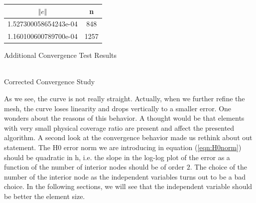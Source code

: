 \documentclass[a4paper,12pt]{article}
\makeatletter
\newenvironment{tablehere}
  {\def\@captype{table}}
  {}
\newenvironment{figurehere}
  {\def\@captype{figure}}
  {}
\makeatother
\begin{document}
\begin{center}
\begin{tablehere}
\begin{tabular}{cc}
 $\Vert e \Vert$ & n \\
\hline
\hline
1.527300058654243e-04 & 848\\
1.160100600789700e-04 & 1257
\end{tabular}
\caption{Additional Convergence Test Results}\label{tab:convergenceAdd}
\end{tablehere}
\end{center}
\begin{center}
\begin{figurehere}
\\
\caption{Corrected Convergence Study}\label{fig:convergence2}
\end{figurehere}
\end{center}
As we see, the curve is not really straight.  Actually, when we further refine the mesh, the curve loses linearity and drops vertically to a smaller error. One wonders about the reasons of this behavior. A thought would be that elements with very small physical coverage ratio are present and affect the presented algorithm.
A second look at the convergence behavior made us rethink about out statement. The H$0$ error norm we are introducing in equation (\ref{eqn:H0norm}) should be quadratic in h, i.e. the slope in the log-log plot of the error as a function of the number of interior nodes should be of order $2$. The choice of the number of the interior node as the independent variables turns out to be a bad choice. In the following sections, we will see that the independent variable should be better the element size.\\
\end{document}

